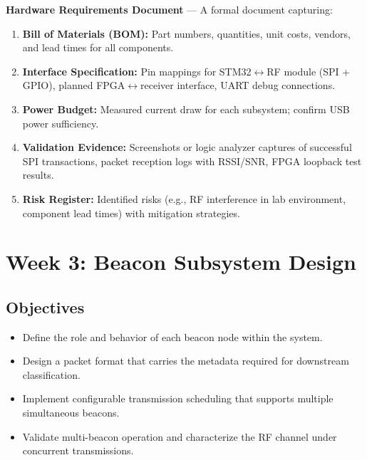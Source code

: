 \documentclass[11pt,letterpaper]{article}
\begin{document}
	\begin{tcolorbox}[deliverable={Week 2 Deliverable}]
		\textbf{Hardware Requirements Document} --- A formal document capturing:
		\begin{enumerate}
			\item \textbf{Bill of Materials (BOM):} Part numbers, quantities, unit costs, vendors, and lead times for all components.
			\item \textbf{Interface Specification:} Pin mappings for STM32$\leftrightarrow$RF module (SPI + GPIO), planned FPGA$\leftrightarrow$receiver interface, UART debug connections.
			\item \textbf{Power Budget:} Measured current draw for each subsystem; confirm USB power sufficiency.
			\item \textbf{Validation Evidence:} Screenshots or logic analyzer captures of successful SPI transactions, packet reception logs with RSSI/SNR, FPGA loopback test results.
			\item \textbf{Risk Register:} Identified risks (e.g., RF interference in lab environment, component lead times) with mitigation strategies.
		\end{enumerate}
	\end{tcolorbox}
	
	\newpage
	\section{Week 3: Beacon Subsystem Design}
	\label{sec:beacon}
	
	\subsection{Objectives}
	
	\begin{itemize}[leftmargin=2em]
		\item Define the role and behavior of each beacon node within the system.
		\item Design a packet format that carries the metadata required for downstream classification.
		\item Implement configurable transmission scheduling that supports multiple simultaneous beacons.
		\item Validate multi-beacon operation and characterize the RF channel under concurrent transmissions.
	\end{itemize}
	
\end{document}
